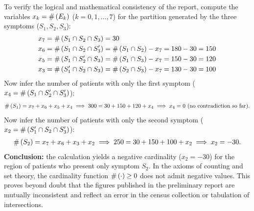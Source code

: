 \begin{solproblema}
	To verify the logical and mathematical consistency of the report, compute the variables $x_k = \#\left( E_k \right)$ ($k=0,1,\dots,7$) for the partition generated by the three symptoms ($S_1, S_2, S_3$):
	\begin{align}
		x_7 &= \#\left( S_1 \cap S_2 \cap S_3 \right) = 30 \\
		x_6 &= \#\left( S_1 \cap S_2 \cap S_3' \right) = \#\left( S_1 \cap S_2 \right) - x_7 = 180 - 30 = 150 \\
		x_5 &= \#\left( S_1 \cap S_2' \cap S_3 \right) = \#\left( S_1 \cap S_3 \right) - x_7 = 150 - 30 = 120 \\
		x_3 &= \#\left( S_1' \cap S_2 \cap S_3 \right) = \#\left( S_2 \cap S_3 \right) - x_7 = 130 - 30 = 100
	\end{align}
	Now infer the number of patients with only the first symptom ($x_4 = \#\left( S_1 \cap S_2' \cap S_3' \right)$):
	\begin{align}
		\#\left( S_1 \right) = x_7 + x_6 + x_5 + x_4 \implies 300 = 30 + 150 + 120 + x_4 \implies x_4 = 0 \text{ (no contradiction so far).}
	\end{align}
	Now infer the number of patients with only the second symptom ($x_2 = \#\left( S_1' \cap S_2 \cap S_3' \right)$):
	\begin{align}
		\#\left( S_2 \right) = x_7 + x_6 + x_3 + x_2 \implies 250 = 30 + 150 + 100 + x_2 \implies x_2 = -30.
	\end{align}
	\textbf{Conclusion:} the calculation yields a negative cardinality ($x_2 = -30$) for the region of patients who present only symptom $S_2$. In the axioms of counting and set theory, the cardinality function $\#\left( \cdot \right) \ge 0$ does not admit negative values. This proves beyond doubt that the figures published in the preliminary report are mutually inconsistent and reflect an error in the census collection or tabulation of intersections.
\end{solproblema}

